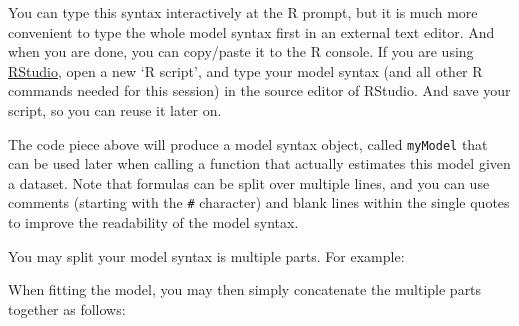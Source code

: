 You can type this syntax interactively at the R prompt, but it is much
more convenient to type the whole model syntax first in an external text
editor. And when you are done, you can copy/paste it to the R console.
If you are using \href{http://www.rstudio.com/}{RStudio}, open a new `R
script', and type your model syntax (and all other R commands needed for
this session) in the source editor of RStudio. And save your script, so
you can reuse it later on.

The code piece above will produce a model syntax object, called
\texttt{myModel} that can be used later when calling a function that
actually estimates this model given a dataset. Note that formulas can be
split over multiple lines, and you can use comments (starting with the
\texttt{\#} character) and blank lines within the single quotes to
improve the readability of the model syntax.

You may split your model syntax is multiple parts. For example:

\begin{Shaded}
\begin{Highlighting}[]
\OtherTok{\textless{}{-}} 
\StringTok{         \textquotesingle{}}
\OtherTok{\textless{}{-}} 
\StringTok{         \textquotesingle{}}
\end{Highlighting}
\end{Shaded}

When fitting the model, you may then simply concatenate the multiple
parts together as follows:

\begin{Shaded}
\begin{Highlighting}[]
\OtherTok{\textless{}{-}} \NormalTok{(} 
\end{Highlighting}
\end{Shaded}

